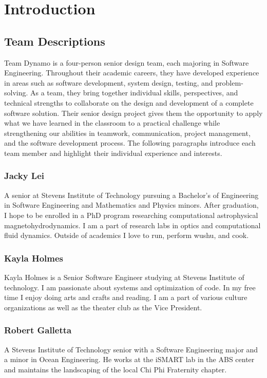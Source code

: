 \chapter{Introduction}
\label{Introduction}

\section{Team Descriptions}
Team Dynamo is a four-person senior design team, each majoring in Software Engineering. Throughout their academic careers, they have developed experience in areas such as software development, system design, testing, and problem-solving. As a team, they bring together individual skills, perspectives, and technical strengths to collaborate on the design and development of a complete software solution. Their senior design project gives them the opportunity to apply what we have learned in the classroom to a practical challenge while strengthening our abilities in teamwork, communication, project management, and the software development process. The following paragraphs introduce each team member and highlight their individual experience and interests.

\subsection{Jacky Lei}
A senior at Stevens Institute of Technology pursuing a Bachelor’s of Engineering in Software Engineering and Mathematics and Physics minors. After graduation, I hope to be enrolled in a PhD program researching computational astrophysical magnetohydrodynamics. I am a part of research labs in optics and computational fluid dynamics. Outside of academics I love to run, perform wushu, and cook.

\subsection{Kayla Holmes}
Kayla Holmes is a Senior Software Engineer studying at Stevens Institute of technology. I am passionate about systems and optimization of code. In my free time I enjoy doing arts and crafts and reading. I am a part of various culture organizations as well as the theater club as the Vice President.

\subsection{Robert Galletta}
A Stevens Institute of Technology senior with a Software Engineering major and a minor in Ocean Engineering. He works at the iSMART lab in the ABS center and maintains the landscaping of the local Chi Phi Fraternity chapter. 

